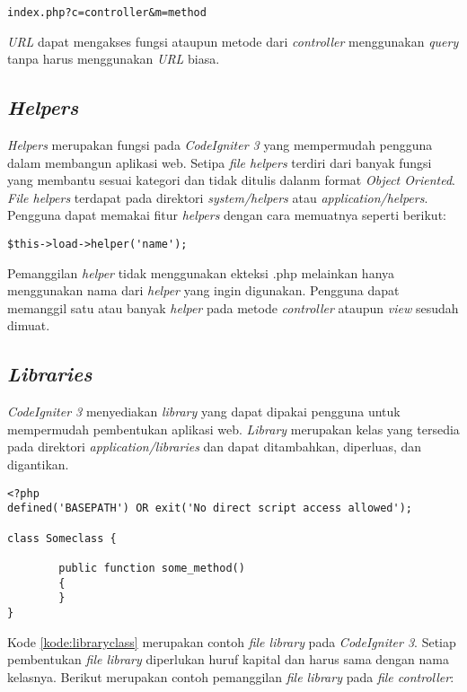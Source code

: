 \begin{center}
\verb|index.php?c=controller&m=method|
\end{center}

\textit{URL} dapat mengakses fungsi ataupun metode dari \textit{controller} menggunakan \textit{query} tanpa harus menggunakan \textit{URL} biasa.

\subsection{\textit{Helpers}}
\textit{Helpers} merupakan fungsi pada \textit{CodeIgniter 3}
yang mempermudah pengguna dalam membangun aplikasi web. Setipa \textit{file helpers} terdiri dari banyak fungsi yang membantu sesuai kategori dan tidak ditulis dalanm format \textit{Object Oriented}. \textit{File helpers} terdapat pada direktori \textit{system/helpers} atau \textit{application/helpers}. Pengguna dapat memakai fitur \textit{helpers} dengan cara memuatnya seperti berikut:

\begin{center}
\verb|$this->load->helper('name');|
\end{center}

Pemanggilan \textit{helper} tidak menggunakan ekteksi .php melainkan hanya menggunakan nama dari \textit{helper} yang ingin digunakan. Pengguna dapat memanggil satu atau banyak \textit{helper} pada metode \textit{controller} ataupun \textit{view} sesudah dimuat.

\subsection{\textit{Libraries}}
\textit{CodeIgniter 3} menyediakan \textit{library} yang dapat dipakai pengguna untuk mempermudah pembentukan aplikasi web. \textit{Library} merupakan kelas yang tersedia pada direktori \textit{application/libraries} dan dapat ditambahkan, diperluas, dan digantikan. 

\begin{lstlisting}[caption=Contoh kelas \textit{library} pada \textit{CodeIgniter 3}, label=kode:libraryclass]
<?php
defined('BASEPATH') OR exit('No direct script access allowed');

class Someclass {

        public function some_method()
        {
        }
}
\end{lstlisting}

Kode \ref{kode:libraryclass} merupakan contoh \textit{file library} pada \textit{CodeIgniter 3}. Setiap pembentukan \textit{file library} diperlukan huruf kapital dan harus sama dengan nama kelasnya. Berikut merupakan contoh pemanggilan \textit{file library} pada \textit{file controller}:

